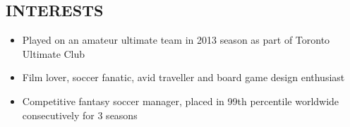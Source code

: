 \documentclass[10pt]{res} %
\begin{document}
\begin{resume}
\vspace{0.2in} %


\section{INTERESTS} 

\vspace{0.2in} %

\begin{itemize}
    \item Played on an amateur ultimate team in 2013 season as part of Toronto Ultimate Club
    \item Film lover, soccer fanatic, avid traveller and board game design enthusiast
    \item Competitive fantasy soccer manager, placed in 99th percentile worldwide consecutively for 3 seasons
\end{itemize} 


\end{resume} 
\end{document}
